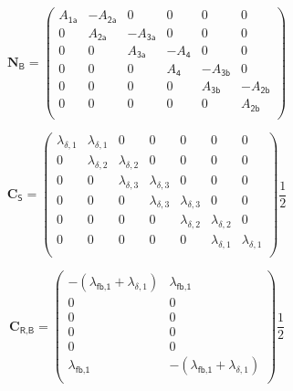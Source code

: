 %
\begin{equation}
\label{equ_04ModellLuft25}
\textbf{N}_\textsf{B} = \left(\begin{array}{cccccc} 
A_\textsf{1a} & -A_\textsf{2a} & 0 & 0 & 0 & 0 \\
0 & A_\textsf{2a} & -A_\textsf{3a} & 0 & 0 & 0 \\
0 & 0 & A_\textsf{3a} & -A_\textsf{4} & 0 & 0 \\
0 & 0 & 0 & A_\textsf{4} & -A_\textsf{3b} & 0 \\
0 & 0 & 0 & 0 & A_\textsf{3b} & -A_\textsf{2b} \\
0 & 0 & 0 & 0 & 0 & A_\textsf{2b} \\
\end{array}\right)
\end{equation}
%

%
\begin{equation}
\label{equ_04ModellLuft26}
\textbf{C}_\textsf{S} = \left(\begin{array}{ccccccc} 
\lambda_{\delta,1} & \lambda_{\delta,1} & 0 & 0 & 0 & 0 & 0 \\
0 & \lambda_{\delta,2} & \lambda_{\delta,2} & 0 & 0 & 0 & 0 \\
0 & 0 & \lambda_{\delta,3} & \lambda_{\delta,3} & 0 & 0 & 0 \\
0 & 0 & 0 & \lambda_{\delta,3} & \lambda_{\delta,3} & 0 & 0 \\
0 & 0 & 0 & 0 & \lambda_{\delta,2} & \lambda_{\delta,2} & 0 \\
0 & 0 & 0 & 0 & 0 & \lambda_{\delta,1} & \lambda_{\delta,1} \\
\end{array}\right)\frac{1}{2}
\end{equation}
%

%
\begin{equation}
\label{equ_04ModellLuft27}
\textbf{C}_\textsf{R,B} = \left(\begin{array}{cc} 
-\left(\lambda_\textsf{fb,1} + \lambda_{\delta,1} \right) & \lambda_\textsf{fb,1} \\
0 & 0 \\
0 & 0 \\
0 & 0 \\
0 & 0 \\
\lambda_\textsf{fb,1} & -\left(\lambda_\textsf{fb,1} + \lambda_{\delta,1} \right) \\
\end{array}\right)\frac{1}{2}
\end{equation}
%

